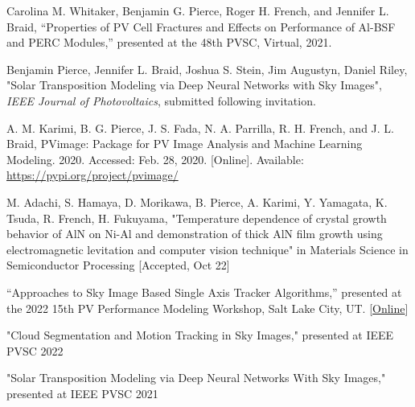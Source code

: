 \documentclass[10pt]{article}
\begin{document}
{\begin{newitemize}
        \item {Carolina M. Whitaker, { Benjamin G. Pierce}, Roger H. French, and Jennifer L. Braid, “Properties of PV Cell Fractures and Effects on Performance of Al-BSF and PERC Modules,” presented at the 48th PVSC, Virtual, 2021.
        \item{{ Benjamin Pierce}, Jennifer L. Braid, Joshua S. Stein, Jim Augustyn, Daniel Riley, "Solar Transposition Modeling via Deep Neural Networks with Sky Images", \textit{IEEE Journal of Photovoltaics}, submitted following invitation.  }
        \item{A. M. Karimi,  B. G. Pierce}, J. S. Fada, N. A. Parrilla, R. H. French, and J. L. Braid, PVimage: Package for PV Image Analysis and Machine Learning Modeling. 2020. Accessed: Feb. 28, 2020. [Online]. Available: \href{https://pypi.org/project/pvimage/}{https://pypi.org/project/pvimage/}
        
    
        
        }
        
        \item{
        M. Adachi, S. Hamaya, D. Morikawa, { B. Pierce}, A. Karimi, Y. Yamagata, K. Tsuda, R. French,  H. Fukuyama, "Temperature dependence of crystal growth behavior of AlN on Ni-Al and demonstration of thick AlN film growth using electromagnetic levitation and computer vision technique" in Materials Science in Semiconductor Processing [Accepted, Oct 22] 
        }
        
        
	\end{newitemize}}
    
    
    
{\begin{newitemize}
    \item {“Approaches to Sky Image Based Single Axis Tracker Algorithms,” presented at the 2022 15th PV Performance Modeling Workshop, Salt Lake City, UT. [\href{https://pvpmc.sandia.gov/resources-and-events/events/2022-pvpmc-workshop/}{Online}]}
    
    \item {
    "Cloud Segmentation and Motion Tracking in Sky Images," presented at IEEE PVSC 2022
    
    }
    \item {
        "Solar Transposition Modeling via Deep Neural Networks With Sky Images," presented at IEEE PVSC 2021
        
        }
    
\end{newitemize}}
\end{document}
